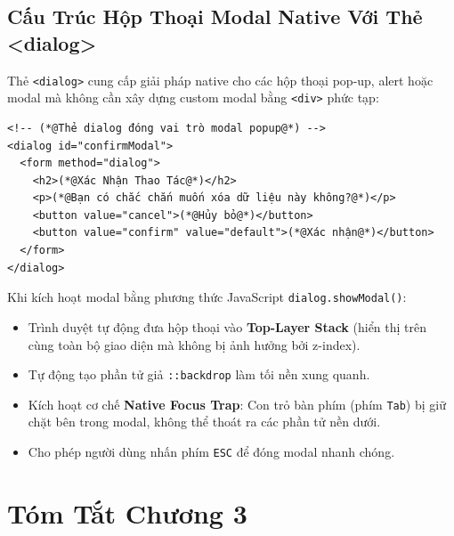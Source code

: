 \documentclass[11pt,oneside]{book}
\newcommand{\codeinline}[1]{\textcolor{accentOrange}{\texttt{#1}}}
\newcommand{\term}[1]{\textbf{\textcolor{primaryBlue}{#1}}}
\begin{document}
\Needspace*{120pt}
\subsection{Cấu Trúc Hộp Thoại Modal Native Với Thẻ <dialog>}

Thẻ \codeinline{<dialog>} cung cấp giải pháp native cho các hộp thoại pop-up, alert hoặc modal mà không cần xây dựng custom modal bằng \codeinline{<div>} phức tạp:

\begin{codeWindow}
\begin{lstlisting}[language=HTML5]
<!-- (*@Thẻ dialog đóng vai trò modal popup@*) -->
<dialog id="confirmModal">
  <form method="dialog">
    <h2>(*@Xác Nhận Thao Tác@*)</h2>
    <p>(*@Bạn có chắc chắn muốn xóa dữ liệu này không?@*)</p>
    <button value="cancel">(*@Hủy bỏ@*)</button>
    <button value="confirm" value="default">(*@Xác nhận@*)</button>
  </form>
</dialog>
\end{lstlisting}
\end{codeWindow}

\begin{conceptBox}
Khi kích hoạt modal bằng phương thức JavaScript \codeinline{dialog.showModal()}:
\begin{itemize}[leftmargin=1.5em, itemsep=3pt, parsep=0pt]
    \item Trình duyệt tự động đưa hộp thoại vào \term{Top-Layer Stack} (hiển thị trên cùng toàn bộ giao diện mà không bị ảnh hưởng bởi z-index).
    \item Tự động tạo phần tử giả \codeinline{::backdrop} làm tối nền xung quanh.
    \item Kích hoạt cơ chế \term{Native Focus Trap}: Con trỏ bàn phím (phím \codeinline{Tab}) bị giữ chặt bên trong modal, không thể thoát ra các phần tử nền dưới.
    \item Cho phép người dùng nhấn phím \codeinline{ESC} để đóng modal nhanh chóng.
\end{itemize}
\end{conceptBox}

\Needspace*{80pt}
\section{Tóm Tắt Chương 3}
\end{document}
